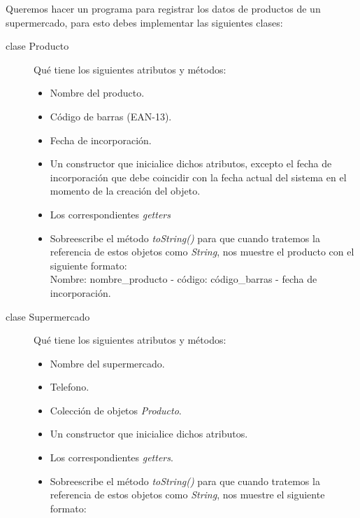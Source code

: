 \documentclass[addpoints,12pt]{exam}
\begin{document}
\begin{center}
\end{center}
\vspace{0.1in}
\begin{questions}
\question Queremos hacer un programa para registrar los datos de productos de un supermercado, para esto debes implementar las siguientes clases:
\begin{description}
\item[clase Producto] Qué tiene los siguientes atributos y métodos:
\begin{itemize}
\item Nombre del producto.
\item Código de barras (EAN-13).
\item Fecha de incorporación.
\item Un constructor que inicialice dichos atributos, excepto el fecha de incorporación que debe coincidir con la fecha actual del sistema en el momento de la creación del objeto.
\item Los correspondientes \emph{getters}
\item Sobreescribe el método \emph{toString()} para que cuando tratemos la referencia de estos objetos como \emph{String}, nos muestre el producto con el siguiente formato:\\
Nombre: nombre\_producto - código: código\_barras - fecha de incorporación.
\end{itemize}
\item[clase Supermercado] Qué tiene los siguientes atributos y métodos:
\begin{itemize}
\item Nombre del supermercado.
\item Telefono.
\item Colección de objetos \emph{Producto}.
\item Un constructor que inicialice dichos atributos.
\item Los correspondientes \emph{getters}.
\item Sobreescribe el método \emph{toString()} para que cuando tratemos la referencia de estos objetos como \emph{String}, nos muestre  el siguiente formato:\\

\end{itemize}
\end{description}
\end{questions}
\end{document}
